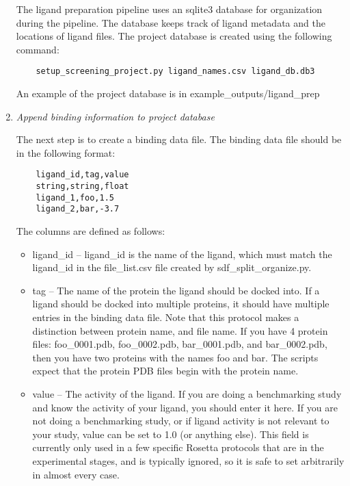 \begin{enumerate}
	The ligand preparation pipeline uses an sqlite3 database for organization during the pipeline.
	The database keeps track of ligand metadata and the locations of ligand files.
	The project database is created using the following command:

	\begin{verbatim}
	setup_screening_project.py ligand_names.csv ligand_db.db3
	\end{verbatim}

  	An example of the project database is in example\_outputs/ligand\_prep
\item
	\emph{Append binding information to project database}

	The next step is to create a binding data file. The binding data file should be in the following format:

	\begin{verbatim}
	ligand_id,tag,value
	string,string,float
	ligand_1,foo,1.5
	ligand_2,bar,-3.7
	\end{verbatim}

	The columns are defined as follows:

	\begin{itemize}
	\itemsep1pt\parskip0pt
	\item
		ligand\_id -- ligand\_id is the name of the ligand, which must match the ligand\_id in the file\_list.csv file created by sdf\_split\_organize.py.
	\item
 		tag -- The name of the protein the ligand should be docked into.
		If a ligand should be docked into multiple proteins, it should have multiple entries in the binding data file.
		Note that this protocol makes a distinction between protein name, and file name.
		If you have 4 protein files: foo\_0001.pdb, foo\_0002.pdb, bar\_0001.pdb, and bar\_0002.pdb, then you have two proteins with the names foo and bar.
		The scripts expect that the protein \ac{PDB} files begin with the protein name.
	\item
		value -- The activity of the ligand. If you are doing a benchmarking study and know the activity of your ligand, you should enter it here.
		If you are not doing a benchmarking study, or if ligand activity is not relevant to your study, value can be set to 1.0 (or anything else). 
		This field is currently only used in a few specific Rosetta protocols that are in the experimental stages, and is  typically ignored, so it is safe to set arbitrarily in almost every  case.
	\end{itemize}


\end{enumerate}
